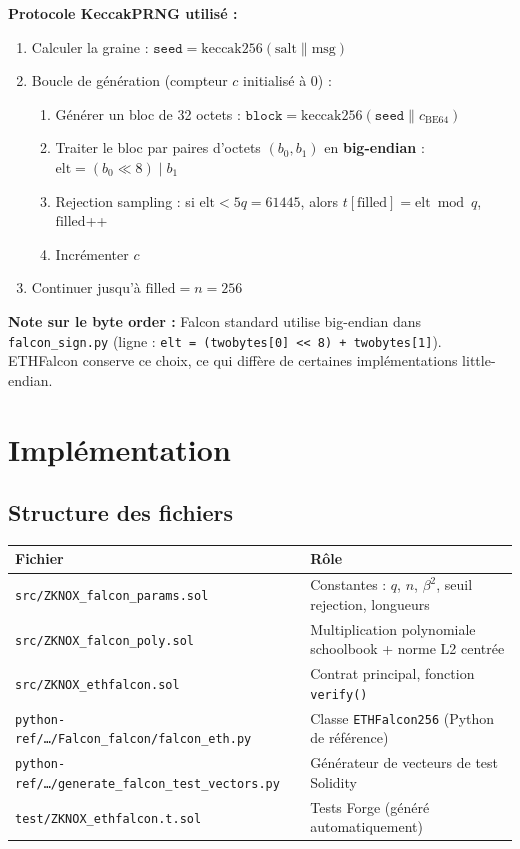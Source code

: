 \documentclass[11pt,a4paper]{article}
\begin{document}
\textbf{Protocole KeccakPRNG utilisé :}
\begin{enumerate}
  \item Calculer la graine : $\texttt{seed} = \mathrm{keccak256}(\mathrm{salt} \| \mathrm{msg})$
  \item Boucle de génération (compteur $c$ initialisé à 0) :
    \begin{enumerate}
      \item Générer un bloc de 32 octets :
            $\texttt{block} = \mathrm{keccak256}(\texttt{seed} \| c_{\mathrm{BE64}})$
      \item Traiter le bloc par paires d'octets $(b_0, b_1)$ en \textbf{big-endian} :
            $\mathrm{elt} = (b_0 \ll 8) \mid b_1$
      \item Rejection sampling : si $\mathrm{elt} < 5q = 61445$, alors
            $t[\mathrm{filled}] = \mathrm{elt} \bmod q$, $\mathrm{filled}$++
      \item Incrémenter $c$
    \end{enumerate}
  \item Continuer jusqu'à $\mathrm{filled} = n = 256$
\end{enumerate}

\textbf{Note sur le byte order :} Falcon standard utilise big-endian dans
\texttt{falcon\_sign.py} (ligne : \texttt{elt = (twobytes[0] << 8) + twobytes[1]}).
ETHFalcon conserve ce choix, ce qui diffère de certaines implémentations
little-endian.

\section{Implémentation}

\subsection{Structure des fichiers}

\begin{center}
\begin{tabular}{lp{8cm}}
\toprule
Fichier & Rôle \\
\midrule
\texttt{src/ZKNOX\_falcon\_params.sol} &
  Constantes : $q$, $n$, $\beta^2$, seuil rejection, longueurs \\
\texttt{src/ZKNOX\_falcon\_poly.sol} &
  Multiplication polynomiale schoolbook + norme L2 centrée \\
\texttt{src/ZKNOX\_ethfalcon.sol} &
  Contrat principal, fonction \texttt{verify()} \\
\midrule
\texttt{python-ref/\ldots/Falcon\_falcon/falcon\_eth.py} &
  Classe \texttt{ETHFalcon256} (Python de référence) \\
\texttt{python-ref/\ldots/generate\_falcon\_test\_vectors.py} &
  Générateur de vecteurs de test Solidity \\
\texttt{test/ZKNOX\_ethfalcon.t.sol} &
  Tests Forge (généré automatiquement) \\
\bottomrule
\end{tabular}
\end{center}
\end{document}

